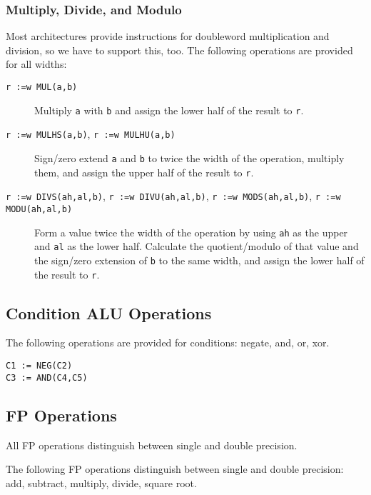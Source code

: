 \documentclass{article}
\newcommand{\ir}[1]{\texttt{#1}}
\begin{document}
\subsubsection{Multiply, Divide, and Modulo}

Most architectures provide instructions for doubleword multiplication
and division, so we have to support this, too.  The following
operations are provided for all widths:

\begin{description}
\item[\ir{r :=w MUL(a,b)}] Multiply \ir{a} with \ir{b} and
assign the lower half of the result to \ir{r}.

\item[\ir{r :=w MULHS(a,b)}, \ir{r :=w MULHU(a,b)}] Sign/zero extend
\ir{a} and \ir{b} to twice the width of the operation, multiply them,
and assign the upper half of the result to \ir{r}.

\item[\ir{r :=w DIVS(ah,al,b)}, \ir{r :=w DIVU(ah,al,b)},
\ir{r :=w MODS(ah,al,b)}, \ir{r :=w MODU(ah,al,b)}] Form a value twice
the width of the operation by using \ir{ah} as the upper and \ir{al} as
the lower half.  Calculate the quotient/modulo of that value and the
sign/zero extension of \ir{b} to the same width, and assign the lower
half of the result to \ir{r}.
\end{description}

\subsection{Condition ALU Operations}

The following operations are provided for conditions: negate, and, or,
xor.

\begin{verbatim}
C1 := NEG(C2)
C3 := AND(C4,C5)
\end{verbatim}

\subsection{FP Operations}

All FP operations distinguish between single and double precision.

The following FP operations distinguish between single and double
precision: add, subtract, multiply, divide, square root.
\end{document}
